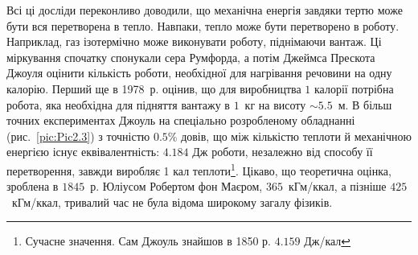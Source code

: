 Всі ці досліди переконливо доводили, що механічна енергія завдяки тертю може бути вся перетворена в
тепло. Навпаки, тепло може бути перетворено в роботу. Наприклад, газ ізотермічно може виконувати
роботу, піднімаючи вантаж. Ці міркування спочатку спонукали сера Румфорда, а потім Джеймса Прескота
Джоуля оцінити кількість роботи, необхідної для нагрівання речовини на одну калорію. Перший ще в
1978~р. оцінив, що для виробництва $1$ калорії потрібна робота, яка
необхідна для підняття вантажу в $1$~кг на висоту $\sim5.5$~м. В більш точних
експериментах Джоуль на спеціально розробленому обладнанні
(рис.~\ref{pic:Pic2.3}) з точністю $0.5$\% довів, що між кількістю теплоти й механічною енергією існує
еквівалентність: $4.184$ Дж роботи, незалежно від способу її перетворення, завжди виробляє 1 кал
теплоти\footnote{Сучасне значення. Сам Джоуль знайшов в 1850 р. $4.159$ Дж/кал}. Цікаво, що теоретична
оцінка, зроблена в $1845$~р. Юліусом Робертом фон Маєром, $365$~кГ\textperiodcentered м/ккал, а
пізніше $425$~кГ\textperiodcentered м/ккал, тривалий час не була відома широкому загалу
фізиків.


